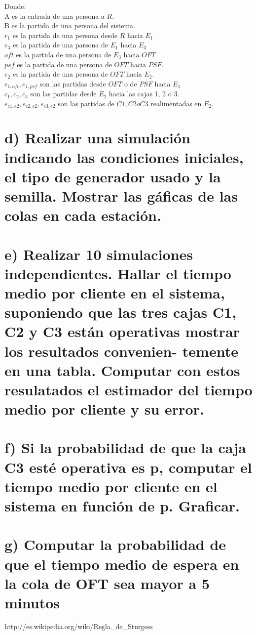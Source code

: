 \documentclass{article}
\numberwithin{equation}{section}
\numberwithin{figure}{section}
\numberwithin{table}{section}
\begin{document}
Donde:\\
A es la entrada de una persona a $R$.\\
B es la partida de una persona del sistema. \\
$r_1$ es la partida de una persona desde $R$ hacia  $E_1$\\
$e_3$ es la partida de una parsona de $E_1$ hacia $E_3$ \\
$oft$ es la partida de una persona de $E_3$ hacia $OFT$\\
$psf$ es la partida de una persona de $OFT$ hacia $PSF$.\\
$e_2$ es la partida de una persona de $OFT$ hacia $E_2$.\\
$e_{1, oft}, e_{1, psf} $ son las partidas desde $OFT$ o de $PSF$ hacia $E_1$\\
$c_1, c_2, c_3$ son las partidas desde $E_2$ hacia las cajas 1, 2 o 3.\\
$e_{c1,e2}, e_{c2,e2}, e_{c3, e2} $ son las partidas de $C1, C2 o C3 $ realimentadas en $E_2$.\\





\section*{d)      Realizar una simulaci\'on indicando las condiciones iniciales, el tipo de generador usado y
la semilla. Mostrar las g\'aficas de las colas en cada estaci\'on.
}

\section*{e)     Realizar 10 simulaciones independientes. Hallar el tiempo medio por cliente en el sistema,
suponiendo que las tres cajas C1, C2 y C3 est\'an operativas mostrar los resultados convenien-
temente en una tabla. Computar con estos resulatados el estimador del tiempo medio por
cliente y su error.
}
\section*{f)    Si la probabilidad de que la caja C3 est\'e operativa es p, computar el tiempo medio por
cliente en el sistema en funci\'on de p. Graficar.
}
\section*{g)   Computar la probabilidad de que el tiempo medio de espera en la cola de OFT sea mayor
a 5 minutos
}

\begin{thebibliography}{1}
http://es.wikipedia.org/wiki/Regla\_de\_Sturgess
\end{thebibliography}
\end{document}
